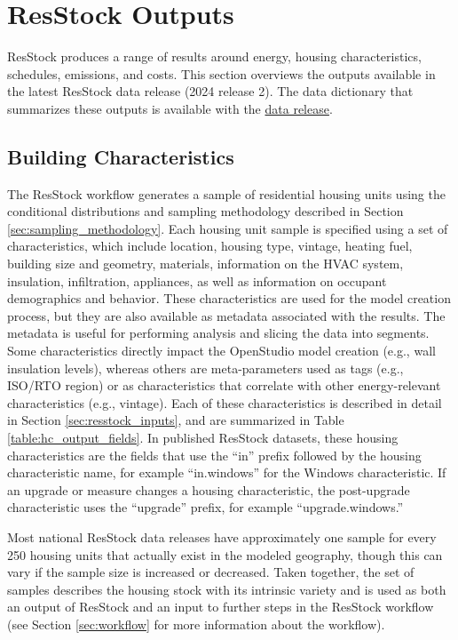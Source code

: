 \chapter{ResStock Outputs}\label{sec:resstock_outputs}
ResStock produces a range of results around energy, housing characteristics, schedules, emissions, and costs. This section overviews the outputs available in the latest ResStock data release (2024 release 2). The data dictionary that summarizes these outputs is available with the \href{https://oedi-data-lake.s3.amazonaws.com/nrel-pds-building-stock/end-use-load-profiles-for-us-building-stock/2024/resstock_amy2018_release_2/data_dictionary.tsv}{data release}.  

\section{Building Characteristics}
The ResStock workflow generates a sample of residential housing units using the conditional distributions and sampling methodology described in Section \ref{sec:sampling_methodology}. Each housing unit sample is specified using a set of characteristics, which include location, housing type, vintage,  heating fuel, building size and geometry, materials, information on the HVAC system, insulation, infiltration, appliances, as well as information on occupant demographics and  behavior. These characteristics are used for the model creation process, but they are also available as metadata associated with the results. The metadata is useful for performing analysis and slicing the data into segments. Some characteristics directly impact the OpenStudio model creation (e.g., wall insulation levels), whereas others are meta-parameters used as tags (e.g., ISO/RTO region) or as characteristics that correlate with other energy-relevant characteristics (e.g., vintage). Each of these characteristics is described in detail in Section \ref{sec:resstock_inputs}, and are summarized in Table \ref{table:hc_output_fields}. In published ResStock datasets, these housing characteristics are the fields that use the ``in'' prefix followed by the housing characteristic name, for example ``in.windows'' for the Windows characteristic. If an upgrade or measure changes a housing characteristic, the post-upgrade characteristic uses the ``upgrade'' prefix, for example ``upgrade.windows.'' 

Most national ResStock data releases have approximately one sample for every 250 housing units that actually exist in the modeled geography, though this can vary if the sample size is increased or decreased. Taken together, the set of samples describes the housing stock with its intrinsic variety and is used as both an output of ResStock and an input to further steps in the ResStock workflow (see Section \ref{sec:workflow} for more information about the workflow). 

